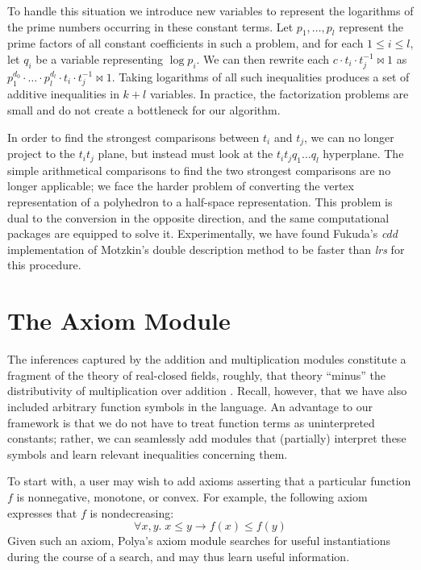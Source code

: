 \documentclass[runningheds]{llncs}
\begin{document}
To handle this situation we introduce new variables to represent the logarithms of the prime numbers occurring in these constant terms. Let $p_1,\ldots, p_l$ represent the prime factors of all constant coefficients in such a problem, and for each $1\leq i \leq l$, let $q_i$ be a variable representing $\log p_i$. We can then rewrite each $c\cdot t_i \cdot t_j^{-1} \bowtie 1$ as $p_1^{d_0}\cdot\ldots\cdot p_l^{d_l} \cdot t_i \cdot t_j^{-1} \bowtie 1$. Taking logarithms of all such inequalities produces a set of additive inequalities in $k+l$ variables. In practice, the factorization problems are small and do not create a bottleneck for our algorithm.

In order to find the strongest comparisons between $t_i$ and $t_j$, we can no longer project to the $t_i t_j$ plane, but instead must look at the $t_it_jq_1\ldots q_l$ hyperplane. The simple arithmetical comparisons to find the two strongest comparisons are no longer applicable; we face the harder problem of converting the vertex representation of a polyhedron to a half-space representation. This problem is dual to the conversion in the opposite direction, and the same computational packages are equipped to solve it. Experimentally, we have found Fukuda's \emph{cdd} implementation of Motzkin's double description method \cite{fukuda:prodon:96} to be faster than \emph{lrs} for this procedure.







\section{The Axiom Module}
\label{section:functions}

The inferences captured by the addition and multiplication modules constitute a fragment of the theory of real-closed fields, roughly, that theory ``minus'' the distributivity of multiplication over addition \cite{avigad:friedman:06}. Recall, however, that we have also included arbitrary function symbols in the language.
An advantage to our framework is that we do not have to treat function
terms as uninterpreted constants; rather, we can seamlessly add
modules that (partially) interpret these symbols and learn relevant inequalities
concerning them.

To start with, a user may wish to add axioms asserting that a particular function $f$ is nonnegative, monotone, or convex. For example, the following axiom expresses that $f$ is nondecreasing:
\[
\forall x, y. \; x \leq y \rightarrow f(x) \leq f(y)
\]
Given such an axiom, Polya's axiom module searches for useful
instantiations during the course of a search, and may thus learn useful information.
\end{document}
